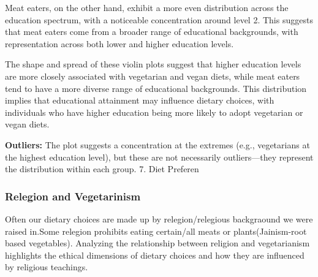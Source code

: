 \documentclass[
]{article}
\begin{document}
Meat eaters, on the other hand, exhibit a more even distribution across
the education spectrum, with a noticeable concentration around level 2.
This suggests that meat eaters come from a broader range of educational
backgrounds, with representation across both lower and higher education
levels.

The shape and spread of these violin plots suggest that higher education
levels are more closely associated with vegetarian and vegan diets,
while meat eaters tend to have a more diverse range of educational
backgrounds. This distribution implies that educational attainment may
influence dietary choices, with individuals who have higher education
being more likely to adopt vegetarian or vegan diets.

\textbf{Outliers:} The plot suggests a concentration at the extremes
(e.g., vegetarians at the highest education level), but these are not
necessarily outliers---they represent the distribution within each
group. 7. Diet Preferen

\subsubsection{Relegion and
Vegetarinism}\label{relegion-and-vegetarinism}

Often our dietary choices are made up by relegion/relegious backgraound
we were raised in.Some relegion prohibits eating certain/all meats or
plants(Jainism-root based vegetables). Analyzing the relationship
between religion and vegetarianism highlights the ethical dimensions of
dietary choices and how they are influenced by religious teachings.
\end{document}
